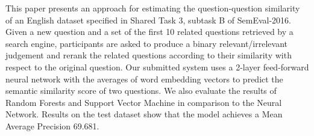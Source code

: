 This paper presents an approach for estimating the question-question similarity of an English dataset specified in Shared Task 3, subtask B of SemEval-2016. Given a new question and a set of the first 10 related questions retrieved by a search engine, participants are asked to produce a binary relevant/irrelevant judgement and rerank the related questions according to their similarity with respect to the original question. Our submitted system uses a 2-layer feed-forward neural network with the averages of word embedding vectors to predict the semantic similarity score of two questions. We also evaluate the results of Random Forests and Support Vector Machine in comparison to the Neural Network. Results on the test dataset show that the model achieves a Mean Average Precision 69.681.

